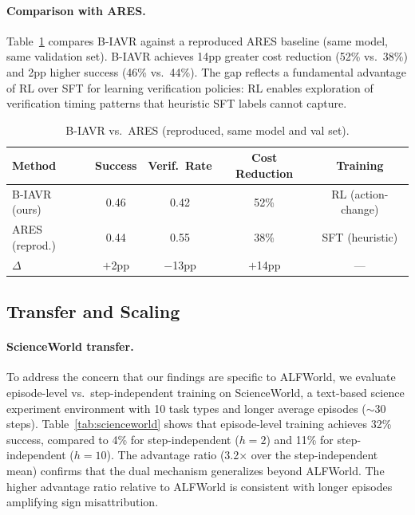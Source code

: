 \documentclass[10pt]{article}
\newcommand{\ours}{B-IAVR}
\begin{document}
\paragraph{Comparison with ARES.}
Table~\ref{tab:ares} compares \ours{} against a reproduced ARES baseline (same model, same validation set). \ours{} achieves 14pp greater cost reduction (52\% vs.\ 38\%) and 2pp higher success (46\% vs.\ 44\%). The gap reflects a fundamental advantage of RL over SFT for learning verification policies: RL enables exploration of verification timing patterns that heuristic SFT labels cannot capture.

\begin{table}[h]
\centering
\caption{\ours{} vs.\ ARES (reproduced, same model and val set).}
\label{tab:ares}
\begin{tabular}{lcccc}
\toprule
Method & Success & Verif.\ Rate & Cost Reduction & Training \\
\midrule
\ours{} (ours) & 0.46 & 0.42 & 52\% & RL (action-change) \\
ARES (reprod.)  & 0.44 & 0.55 & 38\% & SFT (heuristic) \\
\midrule
$\Delta$       & $+$2pp & $-$13pp & $+$14pp & --- \\
\bottomrule
\end{tabular}
\end{table}

\subsection{Transfer and Scaling}

\paragraph{ScienceWorld transfer.}
To address the concern that our findings are specific to ALFWorld, we evaluate episode-level vs.\ step-independent training on ScienceWorld, a text-based science experiment environment with 10 task types and longer average episodes (${\sim}30$ steps). Table~\ref{tab:scienceworld} shows that episode-level training achieves 32\% success, compared to 4\% for step-independent ($h{=}2$) and 11\% for step-independent ($h{=}10$). The advantage ratio (3.2$\times$ over the step-independent mean) confirms that the dual mechanism generalizes beyond ALFWorld. The higher advantage ratio relative to ALFWorld is consistent with longer episodes amplifying sign misattribution.
\end{document}
